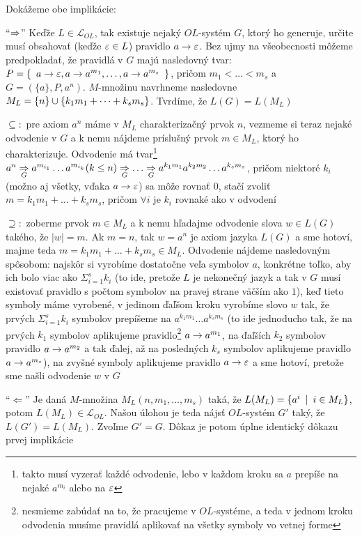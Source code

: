 \begin{dokaz}
    Dokážeme obe implikácie:
    \begin{description}
    \item{``$\Rightarrow$''} Keďže $L\in\mathcal{L}_{OL}$, tak existuje nejaký
    $OL$-systém $G$, ktorý ho generuje, určite musí obsahovať (keďže
    $\varepsilon\in L$) pravidlo $a\rightarrow\varepsilon$. Bez ujmy na
    všeobecnosti môžeme predpokladať, že pravidlá v $G$ majú
    nasledovný tvar: $P=\{\enspace a\rightarrow\varepsilon,a\rightarrow
    a^{m_{1}},\dots,a\rightarrow a^{m_{s}}\enspace\}$, pričom $m_{1}<\dots<m_{s}$
    a $G=(\{a\},P,a^{n})$. $M$-množinu navrhneme nasledovne
    $M_{L}=\{n\}\cup\{k_{1}m_{1}+\dots+k_{s}m_{s}\}$. Tvrdíme, že
    $L(G)=L(M_{L})$
    \begin{description}
    \item{$\subseteq:$} pre axiom $a^{n}$ máme v $M_{L}$
    charakterizačný prvok $n$, vezmeme si teraz nejaké odvodenie v $G$
    a k nemu nájdeme príslušný prvok $m\in M_{L}$, ktorý ho
    charakterizuje. Odvodenie má tvar\footnote{takto musí vyzerať
    každé odvodenie, lebo v každom kroku sa $a$ prepíše na nejaké
    $a^{m_{i}}$ alebo na $\varepsilon$} $a^{n}\underset{G}{\Rightarrow}
    a^{m_{i_{1}}}\dots a^{m_{i_{k}}}(k\leq
    n)\underset{G}{\Rightarrow}\dots\underset{G}{\Rightarrow}
    a^{k_{1}m_{1}}a^{k_{2}m_{2}}\dots a^{k_{s}m_{s}}$, pričom niektoré
    $k_{i}$ (možno aj všetky, vďaka $a\rightarrow\varepsilon$) sa môže rovnať
    $0$, stačí zvoliť $m=k_{1}m_{1}+\dots+k_{s}m_{s}$, pričom $\forall
    i$ je $k_{i}$ rovnaké ako v odvodení
    \item{$\supseteq:$} zoberme prvok $m\in M_{L}$ a k nemu hľadajme
    odvodenie slova $w\in L(G)$ takého, že $|w|=m$. Ak $m=n$, tak
    $w=a^{n}$ je axiom jazyka $L(G)$ a sme hotoví, majme teda
    $m=k_{1}m_{1}+\dots+k_{s}m_{s}\in M_{L}$. Odvodenie nájdeme
    nasledovným spôsobom: najskôr si vyrobíme dostatočne veľa symbolov
    $a$, konkrétne  toľko, aby ich bolo viac ako
    $\Sigma_{i=1}^{s}k_{i}$ (to ide, pretože $L$ je nekonečný jazyk a
    tak v $G$ musí existovať pravidlo s počtom symbolov na pravej
    strane väčším ako $1$), keď tieto symboly máme vyrobené, v jedinom
    ďaľšom kroku vyrobíme slovo $w$ tak, že prvých
    $\Sigma_{i=1}^{s}k_{i}$ symbolov prepíšeme na $a^{k_{1}m_{1}}\dots
    a^{k_{s}m_{s}}$ (to ide jednoducho tak, že na prvých $k_{1}$
    symbolov aplikujeme pravidlo\footnote{nesmieme zabúdať na to, že
    pracujeme v $OL$-systéme, a teda v jednom kroku odvodenia musíme
    pravidlá aplikovať na všetky symboly vo vetnej forme} $a\rightarrow
    a^{m_{1}}$, na ďaľších $k_{2}$ symbolov pravidlo $a\rightarrow a^{m_{2}}$
    a tak ďalej, až na posledných $k_{s}$ symbolov aplikujeme pravidlo
    $a\rightarrow a^{m_{s}}$), na zvyšné symboly aplikujeme pravidlo
    $a\rightarrow\varepsilon$ a sme hotoví, pretože sme našli odvodenie $w$ v
    $G$
    \end{description}
    \item{``$\Leftarrow$''} Je daná $M$-množina
    $M_{L}(n,m_{1},\dots,m_{s})$ taká, že $L(M_{L})=\{a^{i}\enspace |\enspace i\in
    M_{L}\}$, potom $L(M_{L})\in\mathcal{L}_{OL}$. Našou úlohou je
    teda nájsť $OL$-systém $G'$ taký, že $L(G')=L(M_{L})$. Zvoľme
    $G'=G$. Dôkaz je potom úplne identický dôkazu prvej implikácie
    \end{description}
\end{dokaz}


